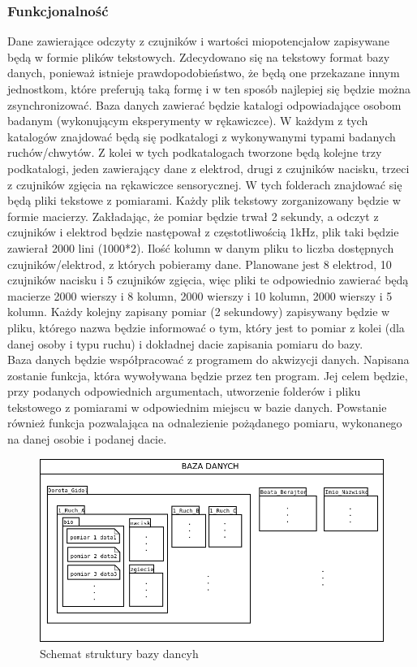 \documentclass{article}
\begin{document}
\subsubsection{Funkcjonalność}
Dane zawierające odczyty z czujników i wartości miopotencjałow zapisywane będą w formie plików tekstowych. Zdecydowano się na tekstowy format bazy danych, ponieważ istnieje prawdopodobieństwo, że będą one przekazane innym jednostkom, które preferują taką formę i w ten sposób najlepiej się będzie można zsynchronizować. Baza danych zawierać będzie katalogi odpowiadające osobom badanym (wykonującym eksperymenty w rękawiczce). W każdym z tych katalogów znajdować będą się podkatalogi z wykonywanymi typami badanych ruchów/chwytów. Z kolei w tych podkatalogach tworzone będą kolejne trzy podkatalogi, jeden zawierający dane z elektrod, drugi z czujników nacisku, trzeci z czujników zgięcia na rękawiczce sensorycznej. W tych folderach znajdować się będą pliki tekstowe z pomiarami. Każdy plik tekstowy zorganizowany będzie w formie macierzy. Zakładając, że pomiar będzie trwał 2 sekundy, a odczyt z czujników i elektrod będzie następował z częstotliwością 1kHz, plik taki będzie zawierał 2000 lini (1000*2). Ilość kolumn w danym pliku to liczba dostępnych czujników/elektrod, z których pobieramy dane. Planowane jest 8 elektrod, 10 czujników nacisku i 5 czujników zgięcia, więc pliki te odpowiednio zawierać będą macierze 2000 wierszy i 8 kolumn, 2000 wierszy i 10 kolumn, 2000 wierszy i 5 kolumn. Każdy kolejny zapisany pomiar (2 sekundowy) zapisywany będzie w pliku, którego nazwa będzie informować o tym, który jest to pomiar z kolei (dla danej osoby i typu ruchu) i dokładnej dacie zapisania pomiaru do bazy.\\
Baza danych będzie współpracować z programem do akwizycji danych. Napisana zostanie funkcja, która wywoływana będzie przez ten program. Jej celem będzie, przy podanych odpowiednich argumentach, utworzenie folderów i pliku tekstowego z pomiarami w odpowiednim miejscu w bazie danych. Powstanie również funkcja pozwalająca na odnalezienie pożądanego pomiaru, wykonanego na danej osobie i podanej dacie.

\begin{figure}[ht!]
\label{fig:baza_danych}
\centering
\includegraphics[width=14cm]{baza_danych.png}
\caption {Schemat struktury bazy dancyh}
\end{figure}
\end{document}
